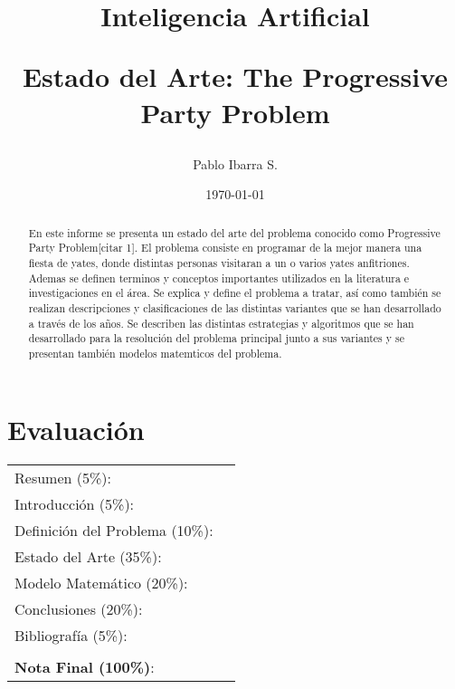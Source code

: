 \documentclass[spanish, fleqn]{article}
\begin{document}
\title{Inteligencia Artificial \\ \begin{Large}Estado del Arte: The Progressive Party Problem\end{Large}}
\author{Pablo Ibarra S.}
\date{\today}
\maketitle

\section*{Evaluación}

\begin{tabular}{ll}
Resumen (5\%): & \underline{\hspace{2cm}} \\
Introducción (5\%):  & \underline{\hspace{2cm}} \\
Definición del Problema (10\%):  & \underline{\hspace{2cm}} \\
Estado del Arte (35\%):  & \underline{\hspace{2cm}} \\
Modelo Matemático (20\%): &  \underline{\hspace{2cm}}\\
Conclusiones (20\%): &  \underline{\hspace{2cm}}\\
Bibliografía (5\%): & \underline{\hspace{2cm}}\\
 &  \\
\textbf{Nota Final (100\%)}:   & \underline{\hspace{2cm}}
\end{tabular}

\begin{abstract}
En este informe se presenta un estado del arte del problema conocido como Progressive Party Problem[citar 1]. El problema consiste en programar de la mejor manera una fiesta de yates, donde distintas personas visitaran a un o varios yates anfitriones. Ademas se definen terminos y conceptos importantes utilizados en la literatura e investigaciones en el área. Se explica y define el problema a tratar, así como también se realizan descripciones y clasificaciones de las distintas variantes que se han desarrollado a través de los años. Se describen las distintas estrategias y algoritmos que se han desarrollado para la resolución del problema principal junto a sus variantes y se presentan también modelos matemticos del problema.
\end{abstract}
\end{document}
